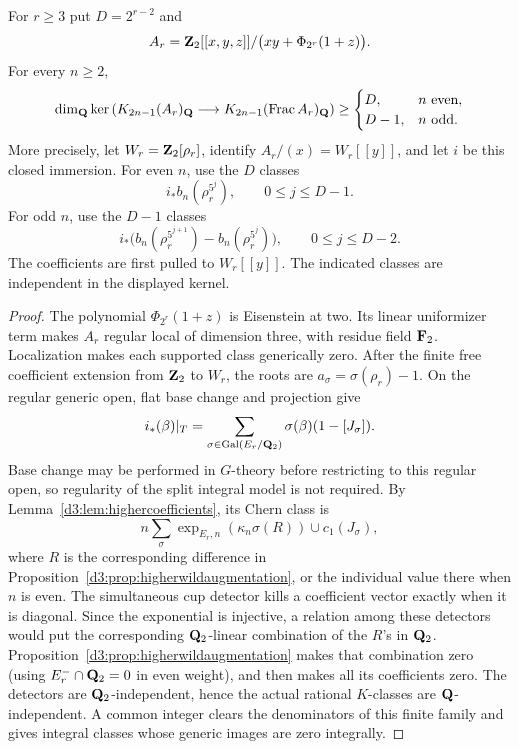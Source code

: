 \begin{theorem}
\label{d3:thm:completedhigherodd}
For $r\geq3$ put $D=2^{r-2}$ and
\[
 A_r=\mathbf Z_2[[x,y,z]]/
 \bigl(xy+\Phi_{2^r}(1+z)\bigr).
\]
For every $n\geq2$,
\[
 \dim_{\mathbf Q}\ker\left(K_{2n-1}(A_r)_{\mathbf Q}
       \longrightarrow K_{2n-1}(\operatorname{Frac} A_r)_{\mathbf Q}\right)
 \geq
 \begin{cases}
 D,& n\text{ even},\\
 D-1,& n\text{ odd}.
 \end{cases}
\]
More precisely, let $W_r=\mathbf Z_2[\rho_r]$, identify
$A_r/(x)=W_r[[y]]$, and let $i$ be this closed immersion.
For even $n$, use the $D$ classes
\[
 i_*b_n(\rho_r^{5^j}),\qquad 0\leq j\leq D-1.
\]
For odd $n$, use the $D-1$ classes
\[
 i_*\bigl(b_n(\rho_r^{5^{j+1}})-b_n(\rho_r^{5^j})\bigr),
 \qquad 0\leq j\leq D-2.
\]
The coefficients are first pulled to $W_r[[y]]$.
The indicated classes are independent in the displayed kernel.
\end{theorem}
\begin{proof}
The polynomial $\Phi_{2^r}(1+z)$ is Eisenstein at two.
Its linear uniformizer term makes $A_r$ regular local of
dimension three, with residue field $\mathbf F_2$.
Localization makes each supported class generically zero.
After the finite free coefficient extension from $\mathbf Z_2$ to $W_r$,
the roots are $a_\sigma=\sigma(\rho_r)-1$.
On the regular generic open, flat base change and projection give
\[
 i_*(\beta)|_T
 =\sum_{\sigma\in\operatorname{Gal}(E_r/\mathbf Q_2)}
      \sigma(\beta)(1-[J_\sigma]).
\]
Base change may be performed in $G$-theory before restricting
to this regular open, so regularity of the split integral model
is not required. By Lemma~\ref{d3:lem:highercoefficients}, its Chern
class is
\[
 n\sum_\sigma
 \exp_{E_r,n}(\kappa_n\sigma(R))\cup c_1(J_\sigma),
\]
where $R$ is the corresponding difference in
Proposition~\ref{d3:prop:higherwildaugmentation}, or the individual
value there when $n$ is even.
The simultaneous cup detector kills a coefficient vector exactly
when it is diagonal. Since the exponential is injective, a
relation among these detectors would put the corresponding
$\mathbf Q_2$-linear combination of the $R$'s in $\mathbf Q_2$.
Proposition~\ref{d3:prop:higherwildaugmentation} makes that combination
zero (using $E_r^-\cap\mathbf Q_2=0$ in even weight), and then makes
all its coefficients zero.
The detectors are $\mathbf Q_2$-independent, hence the actual rational
$K$-classes are $\mathbf Q$-independent. A common integer clears the
denominators of this finite family and gives integral classes
whose generic images are zero integrally.
\end{proof}

